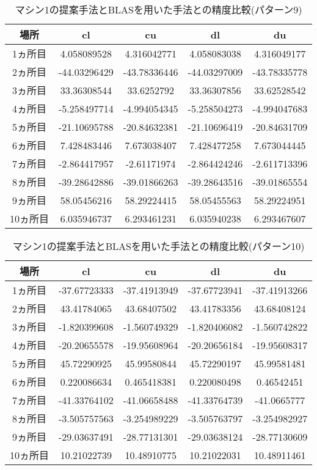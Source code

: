 \documentclass[11pt,a4paper]{jsreport}
\theoremstyle{definition}
\begin{document}
\begin{table}[H]
\centering
\begin{tabular}{|c|c|c|c|c|}
\hline
場所 & cl & cu & dl & du \\ \hline
1ヵ所目 & 4.058089528 & 4.316042771 & 4.058083038 & 4.316049177 \\ \hline
2ヵ所目 & -44.03296429 & -43.78336446 & -44.03297009 & -43.78335778 \\ \hline
3ヵ所目 & 33.36308544 & 33.6252792 & 33.36307856 & 33.62528542 \\ \hline
4ヵ所目 & -5.258497714 & -4.994054345 & -5.258504273 & -4.994047683 \\ \hline
5ヵ所目 & -21.10695788 & -20.84632381 & -21.10696419 & -20.84631709 \\ \hline
6ヵ所目 & 7.428483446 & 7.673038407 & 7.428477258 & 7.673044445 \\ \hline
7ヵ所目 & -2.864417957 & -2.61171974 & -2.864424246 & -2.611713396 \\ \hline
8ヵ所目 & -39.28642886 & -39.01866263 & -39.28643516 & -39.01865554 \\ \hline
9ヵ所目 & 58.05456216 & 58.29224415 & 58.05455563 & 58.29224951 \\ \hline
10ヵ所目 & 6.035946737 & 6.293461231 & 6.035940238 & 6.293467607 \\ \hline
\end{tabular}
\caption{マシン1の提案手法とBLASを用いた手法との精度比較(パターン9)}
\end{table}

\begin{table}[H]
\centering
\begin{tabular}{|c|c|c|c|c|}
\hline
場所 & cl & cu & dl & du \\ \hline
1ヵ所目 & -37.67723333 & -37.41913949 & -37.67723941 & -37.41913266 \\ \hline
2ヵ所目 & 43.41784065 & 43.68407502 & 43.41783356 & 43.68408124 \\ \hline
3ヵ所目 & -1.820399608 & -1.560749329 & -1.820406082 & -1.560742822 \\ \hline
4ヵ所目 & -20.20655578 & -19.95608964 & -20.20656184 & -19.95608317 \\ \hline
5ヵ所目 & 45.72290925 & 45.99580844 & 45.72290197 & 45.99581481 \\ \hline
6ヵ所目 & 0.220086634 & 0.465418381 & 0.220080498 & 0.46542451 \\ \hline
7ヵ所目 & -41.33764102 & -41.06658488 & -41.33764739 & -41.0665777 \\ \hline
8ヵ所目 & -3.505757563 & -3.254989229 & -3.505763797 & -3.254982927 \\ \hline
9ヵ所目 & -29.03637491 & -28.77131301 & -29.03638124 & -28.77130609 \\ \hline
10ヵ所目 & 10.21022739 & 10.48910775 & 10.21022031 & 10.48911461 \\ \hline
\end{tabular}
\caption{マシン1の提案手法とBLASを用いた手法との精度比較(パターン10)}
\end{table}
\end{document}
